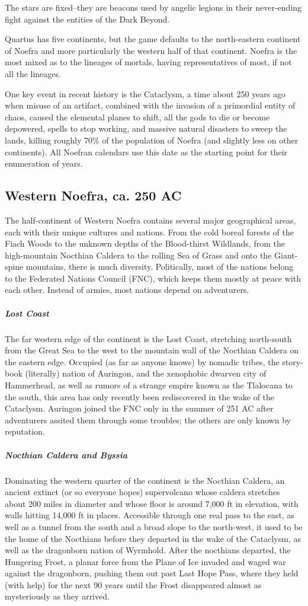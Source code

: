 The stars are  fixed--they are beacons used by angelic legions in their never-ending fight against the entities of the Dark Beyond.

Quartus has five continents, but the game defaults to the north-eastern continent of Noefra and more particularly the western half of that continent. Noefra is the most mixed as to the lineages of mortals, having representatives of most, if not all the lineages.

One key event in recent history is the Cataclysm, a time about 250 years ago when misuse of an artifact, combined with the invasion of a primordial entity of chaos, caused the elemental planes to shift, all the gods to die or become depowered, spells to stop working, and massive natural disasters to sweep the lands, killing roughly 70\% of the population of Noefra (and slightly less on other continents). All Noefran calendars use this date as the starting point for their enumeration of years.

\subsection{Western Noefra, ca. 250 AC}
The half-continent of Western Noefra contains several major geographical areas, each with their unique cultures and nations. From the cold boreal forests of the Fiach Woods to the unknown depths of the Blood-thirst Wildlands, from the high-mountain Nocthian Caldera to the rolling Sea of Grass and onto the Giant-spine mountains, there is much diversity. Politically, most of the nations belong to the Federated Nations Council (FNC), which keeps them mostly at peace with each other. Instead of armies, most nations depend on adventurers.

\subparagraph*{Lost Coast} The far western edge of the continent is the Lost Coast, stretching north-south from the Great Sea to the west to the mountain wall of the Nocthian Caldera on the eastern edge. Occupied (as far as anyone knows) by nomadic tribes, the story-book (literally) nation of Auringon, and the xenophobic dwarven city of Hammerhead, as well as rumors of a strange empire known as the Tlalocana to the south, this area has only recently been rediscovered in the wake of the Cataclysm. Auringon joined the FNC only in the summer of 251 AC after adventurers assited them through some troubles; the others are only known by reputation.

\subparagraph*{Nocthian Caldera and Byssia} Dominating the western quarter of the continent is the Nocthian Caldera, an ancient extinct (or so everyone hopes) supervolcano whose caldera stretches about 200 miles in diameter and whose floor is around 7,000 ft in elevation, with walls hitting 14,000 ft in places. Accessible through one real pass to the east, as well as a tunnel from the south and a broad slope to the north-west, it used to be the home of the Nocthians before they departed in the wake of the Cataclysm, as well as the dragonborn nation of Wyrmhold. After the nocthians departed, the Hungering Frost, a planar force from the Plane of Ice invaded and waged war against the dragonborn, pushing them out past Last Hope Pass, where they held (with help) for the next 90 years until the Frost disappeared almost as mysteriously as they arrived.

